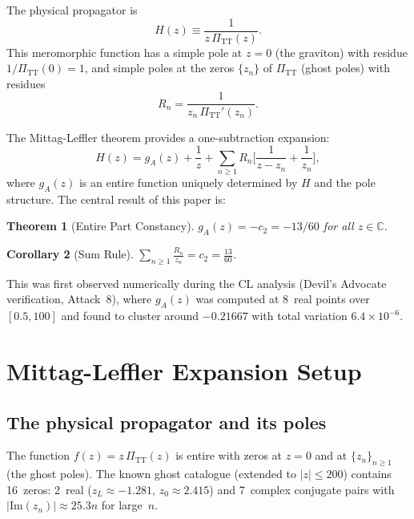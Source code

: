 \documentclass[11pt,a4paper]{article}
\newcommand{\PiTT}{\Pi_{\mathrm{TT}}}
\newcommand{\Imag}{\mathrm{Im}}
\newtheorem{theorem}{Theorem}[section]
\newtheorem{corollary}[theorem]{Corollary}
\begin{document}
The physical propagator is
\begin{equation}\label{eq:H}
  H(z) \equiv \frac{1}{z\,\PiTT(z)}.
\end{equation}
This meromorphic function has a simple pole at $z = 0$ (the graviton)
with residue $1/\PiTT(0) = 1$, and simple poles at the zeros $\{z_n\}$
of $\PiTT$ (ghost poles) with residues
\begin{equation}\label{eq:Rn}
  R_n = \frac{1}{z_n\,\PiTT'(z_n)}.
\end{equation}

The Mittag-Leffler theorem provides a one-subtraction expansion:
\begin{equation}\label{eq:ML}
  H(z) = g_A(z) + \frac{1}{z}
    + \sum_{n \geq 1} R_n \biggl[\frac{1}{z - z_n} + \frac{1}{z_n}\biggr],
\end{equation}
where $g_A(z)$ is an entire function uniquely determined by $H$ and
the pole structure.  The central result of this paper is:

\begin{theorem}[Entire Part Constancy]\label{thm:main}
  $g_A(z) = -c_2 = -13/60$ for all $z \in \mathbb{C}$.
\end{theorem}

\begin{corollary}[Sum Rule]\label{cor:sum_rule}
  $\displaystyle\sum_{n \geq 1} \frac{R_n}{z_n} = c_2 = \frac{13}{60}$.
\end{corollary}

This was first observed numerically during the CL analysis (Devil's
Advocate verification, Attack~8), where $g_A(z)$ was computed at 8~real
points over $[0.5, 100]$ and found to cluster around $-0.21667$ with
total variation $6.4\times 10^{-6}$.

\section{Mittag-Leffler Expansion Setup}
\label{sec:ml_setup}

\subsection{The physical propagator and its poles}

The function $f(z) = z\,\PiTT(z)$ is entire with zeros at $z = 0$ and
at $\{z_n\}_{n \geq 1}$ (the ghost poles).  The known ghost catalogue
(extended to $|z| \leq 200$) contains 16~zeros: 2~real
($z_L \approx -1.281$, $z_0 \approx 2.415$) and 7~complex conjugate pairs
with $|\Imag(z_n)| \approx 25.3 n$ for large~$n$.
\end{document}

